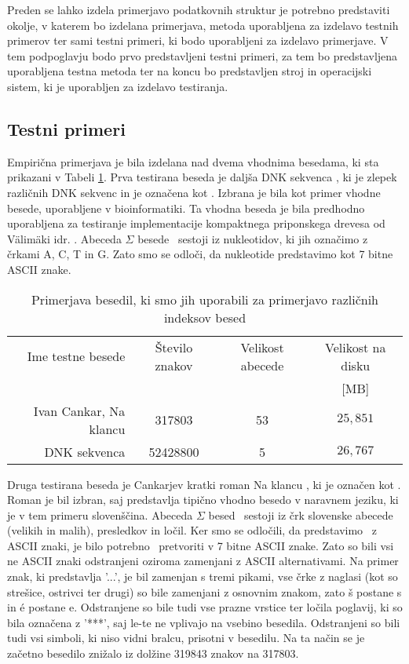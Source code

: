 Preden se lahko izdela primerjavo podatkovnih struktur je potrebno predstaviti okolje, v katerem bo izdelana primerjava, metoda uporabljena za izdelavo testnih primerov ter sami testni primeri, ki bodo uporabljeni za izdelavo primerjave. V tem podpoglavju bodo prvo predstavljeni testni primeri, za tem bo predstavljena uporabljena testna metoda ter na koncu bo predstavljen stroj in operacijski sistem, ki je uporabljen za izdelavo testiranja. 

\subsection{Testni primeri}

Empirična primerjava je bila izdelana nad dvema vhodnima besedama, ki sta prikazani v Tabeli \ref{tab:besedila}. Prva testirana beseda je daljša DNK sekvenca \cite{podatki}, ki je zlepek različnih DNK sekvenc in je označena kot \DNK. Izbrana je bila kot primer vhodne besede, uporabljene v bioinformatiki. Ta vhodna beseda je bila predhodno uporabljena za testiranje implementacije kompaktnega priponskega drevesa od Välimäki idr. \cite{Valimaki2007}. Abeceda $\Sigma$ besede \DNK\ sestoji iz nukleotidov, ki jih označimo z črkami A, C, T in G. Zato smo se odloči, da nukleotide predstavimo kot 7 bitne ASCII znake.

\begin{table}[htb]
    \caption{Primerjava besedil, ki smo jih uporabili za primerjavo različnih indeksov besed}
    \label{tab:besedila}
    \centering
    \begin{tabular}{rccc}
        Ime testne besede& Število znakov & Velikost abecede & Velikost na disku \\
        &  &   & [MB]\\
         \hline
        Ivan Cankar, Na klancu \cite{podatkiNaKlancu}& 317803 & 53 & $25,851$ \\
        DNK sekvenca \cite{podatki}&  52428800& 5 & $26,767$ \\
    \end{tabular}    
\end{table}

Druga testirana beseda je Cankarjev kratki roman Na klancu \cite{podatkiNaKlancu}, ki je označen kot \NK. Roman je bil izbran, saj predstavlja tipično vhodno besedo v naravnem jeziku, ki je v tem primeru slovenščina. Abeceda $\Sigma$ besed \NK\ sestoji iz črk slovenske abecede (velikih in malih), presledkov in ločil. Ker smo se odločili, da predstavimo \DNK\ z ASCII znaki, je bilo potrebno \NK\ pretvoriti v 7 bitne ASCII znake. Zato so bili vsi ne ASCII znaki odstranjeni oziroma zamenjani z ASCII alternativami. Na primer znak, ki predstavlja '...', je bil zamenjan s tremi pikami, vse črke z naglasi (kot so strešice, ostrivci ter drugi) so bile zamenjani z osnovnim znakom, zato š postane s in é postane e. Odstranjene so bile tudi vse prazne vrstice ter ločila poglavij, ki so bila označena z '***', saj le-te ne vplivajo na vsebino besedila. Odstranjeni so bili tudi vsi simboli, ki niso vidni bralcu, prisotni v besedilu. Na ta način se je začetno besedilo znižalo iz dolžine 319843 znakov na 317803.

